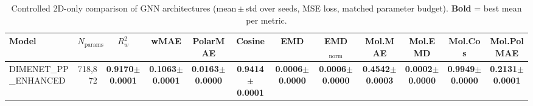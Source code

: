\begin{table}[ht]
\centering
\caption{Controlled 2D-only comparison of GNN architectures (mean\,$\pm$\,std over seeds, MSE loss, matched parameter budget). \textbf{Bold} = best mean per metric.}
\label{tab:benchmark_2d_mse}
\small
\begin{tabular}{l r c c c c c c c c c c }
\toprule
Model & $N_{\text{params}}$ & $R^2_w$ & wMAE & PolarMAE & Cosine & EMD & EMD$_\mathrm{norm}$ & Mol.MAE & Mol.EMD & Mol.Cos & Mol.PolMAE \\
\midrule
DIMENET_PP_ENHANCED & 718,872 & \textbf{0.9170$\pm$0.0001} & \textbf{0.1063$\pm$0.0001} & \textbf{0.0163$\pm$0.0000} & \textbf{0.9414$\pm$0.0001} & \textbf{0.0006$\pm$0.0000} & \textbf{0.0006$\pm$0.0000} & \textbf{0.4542$\pm$0.0003} & \textbf{0.0002$\pm$0.0000} & \textbf{0.9949$\pm$0.0000} & \textbf{0.2131$\pm$0.0001} \\
\bottomrule
\end{tabular}
\end{table}

